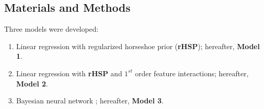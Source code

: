 \documentclass[a0,portrait]{a0poster}
\begin{document}
\begin{multicols}{2}
\section*{Materials and Methods}
Three models were developed:
\begin{enumerate}
    \item Linear regression with regularized horseshoe prior (\textbf{rHSP})\cite{Vehtari:2017b}; hereafter, \textbf{Model 1}.
    \item Linear regression with \textbf{rHSP} and $1^{st}$ order feature interactions; hereafter, \textbf{Model 2}.
    \item Bayesian neural network \cite{Neal:1996bnn}; hereafter, \textbf{Model 3}.
\end{enumerate}



\end{multicols}
\end{document}
